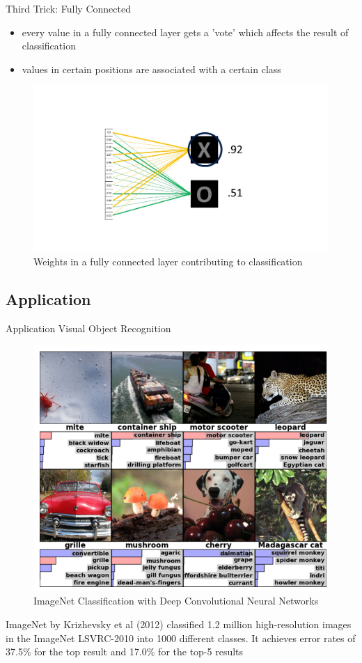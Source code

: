 \documentclass[12pt]{beamer}
\begin{document}
\begin{frame}{Third Trick: Fully Connected}
  \begin{itemize}
  \item every value in a fully connected layer gets a 'vote' which affects the result of classification
  \item values in certain positions are associated with a certain class
    \end{itemize}
\begin{figure}
\includegraphics[width = 0.8\linewidth]{images/fc.jpg}
\caption{Weights in a fully connected layer contributing to classification}
\label{fig:principle}
\end{figure}

\end{frame}















\subsection{Application}
\begin{frame}{Application}
Visual Object Recognition
\begin{figure}
\centering
\includegraphics[width = 0.4\linewidth]{images/KSH-results.png}
\caption{ImageNet Classification with Deep Convolutional
Neural Networks}
\label{fig:principle}
\end{figure}
ImageNet by Krizhevsky et al (2012) classified 1.2 million
high-resolution images in the ImageNet LSVRC-2010 into 1000 different classes.
It achieves error rates of 37.5\% for the top result and 17.0\% for the top-5 results



\end{frame}
\end{document}

